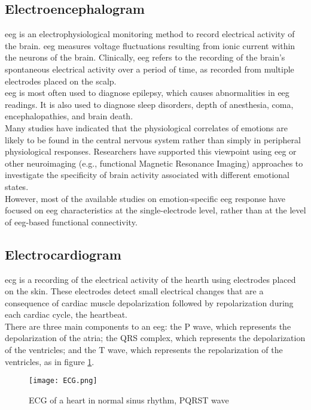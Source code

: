 \subsection{Electroencephalogram}
\gls{eeg} is an electrophysiological monitoring method to record electrical activity of the brain. \gls{eeg} measures voltage fluctuations resulting from ionic current within the neurons of the brain. Clinically, \gls{eeg} refers to the recording of the brain's spontaneous electrical activity over a period of time, as recorded from multiple electrodes placed on the scalp.
\\ \indent
\gls{eeg} is most often used to diagnose epilepsy, which causes abnormalities in \gls{eeg} readings. It is also used to diagnose sleep disorders, depth of anesthesia, coma, encephalopathies, and brain death.
\\ 
Many studies have indicated that the physiological correlates of emotions are likely to be found in the central nervous system rather than simply in peripheral physiological responses. Researchers have supported this viewpoint using \gls{eeg} or other neuroimaging (e.g., functional Magnetic Resonance Imaging) approaches to investigate the specificity of brain activity associated with different emotional states.
\\
However, most of the available studies on emotion-specific \gls{eeg} response have focused on \gls{eeg} characteristics at the single-electrode level, rather than at the level of \gls{eeg}-based functional connectivity.

\subsection{Electrocardiogram}
\gls{ecg} is a recording of the electrical activity of the hearth using electrodes placed on the skin. These electrodes detect small electrical changes that are a consequence of cardiac muscle depolarization followed by repolarization during each cardiac cycle, the heartbeat.
\\ \indent
There are three main components to an \gls{eeg}: the P wave, which represents the depolarization of the atria; the QRS complex, which represents the depolarization of the ventricles; and the T wave, which represents the repolarization of the ventricles, as in figure \ref{fig:ECG}.
\begin{figure}[h]
    \centering
    \texttt{[image: ECG.png]} 
	\caption{ECG of a heart in normal sinus rhythm, PQRST wave}
    \label{fig:ECG}
\end{figure}

